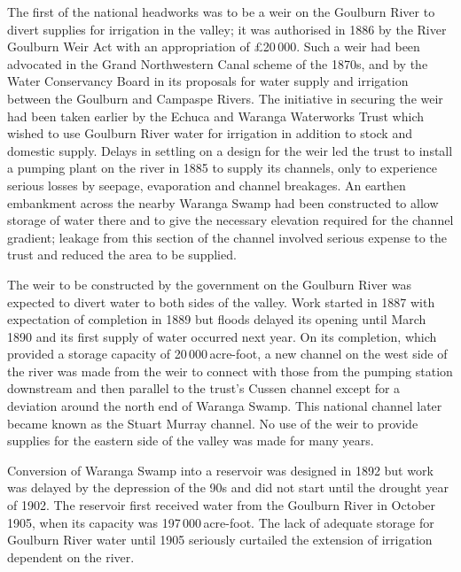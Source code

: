 The first of the national headworks was to be a weir on the Goulburn
River to divert supplies for irrigation in the valley; it was
authorised in 1886 by the River Goulburn Weir Act with an
appropriation of \pounds20\,000.  Such a weir had been advocated in
the Grand Northwestern Canal scheme of the 1870s, and by the Water
Conservancy Board in its proposals for water supply and irrigation
between the Goulburn and Campaspe Rivers.  The initiative in securing
the weir had been taken earlier by the Echuca and Waranga Waterworks
Trust which wished to use Goulburn River water for irrigation in
addition to stock and domestic supply.  Delays in settling on a design
for the weir led the trust to install a pumping plant on the river in
1885 to supply its channels, only to experience serious losses by
seepage, evaporation and channel breakages.  An earthen embankment
across the nearby Waranga Swamp had been constructed to allow storage
of water there and to give the necessary elevation required for the
channel gradient; leakage from this section of the channel involved
serious expense to the trust and reduced the area to be
supplied.

The weir to be constructed by the government on the Goulburn River was
expected to divert water to both sides of the valley.  Work started in
1887 with expectation of completion in 1889 but floods delayed its
opening until March 1890 and its first supply of water occurred next
year.  On its completion, which provided a storage capacity of
20\,000\,acre-foot, a new channel on the west side of the river was
made from the weir to connect with those from the pumping station
downstream and then parallel to the trust's Cussen channel except for
a deviation around the north end of Waranga Swamp.  This national
channel later became known as the Stuart Murray channel.  No use of
the weir to provide supplies for the eastern side of the valley was
made for many years.

Conversion of Waranga Swamp into a reservoir was designed in 1892 but
work was delayed by the depression of the 90s and did not start until
the drought year of 1902.  The reservoir first received water from the
Goulburn River in October 1905, when its capacity was
197\,000\,acre-foot.  The lack of adequate storage for Goulburn River
water until 1905 seriously curtailed the extension of irrigation
dependent on the river.

